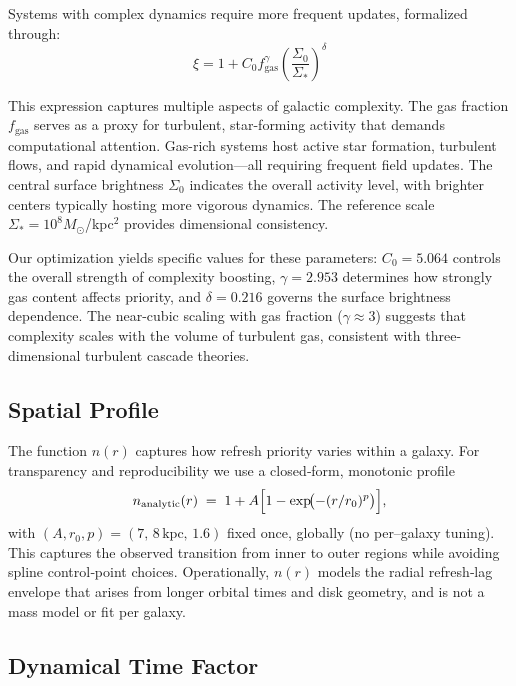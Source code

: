 \documentclass[twocolumn,prd,amsmath,amssymb,aps,superscriptaddress,nofootinbib]{revtex4-2}
\begin{document}
Systems with complex dynamics require more frequent updates, formalized through:
\begin{equation}
\xi = 1 + C_0 f_{\text{gas}}^\gamma \left(\frac{\Sigma_0}{\Sigma_*}\right)^\delta
\end{equation}

This expression captures multiple aspects of galactic complexity. The gas fraction $f_{\text{gas}}$ serves as a proxy for turbulent, star-forming activity that demands computational attention. Gas-rich systems host active star formation, turbulent flows, and rapid dynamical evolution---all requiring frequent field updates. The central surface brightness $\Sigma_0$ indicates the overall activity level, with brighter centers typically hosting more vigorous dynamics. The reference scale $\Sigma_* = 10^8 M_\odot$/kpc$^2$ provides dimensional consistency.

Our optimization yields specific values for these parameters: $C_0 = 5.064$ controls the overall strength of complexity boosting, $\gamma = 2.953$ determines how strongly gas content affects priority, and $\delta = 0.216$ governs the surface brightness dependence. The near-cubic scaling with gas fraction ($\gamma \approx 3$) suggests that complexity scales with the volume of turbulent gas, consistent with three-dimensional turbulent cascade theories.

\subsection{Spatial Profile}

The function $n(r)$ captures how refresh priority varies within a galaxy. For transparency and reproducibility we use a closed‑form, monotonic profile
\begin{equation}
  n_{\mathrm{analytic}}(r)\;=\;1 + A\Bigl[1 - \exp\!\bigl(-(r/r_0)^p\bigr)\Bigr],
\end{equation}
with $(A, r_0, p) = (7,\,8\,\mathrm{kpc},\,1.6)$ fixed once, globally (no per–galaxy tuning). This captures the observed transition from inner to outer regions while avoiding spline control‑point choices.
Operationally, $n(r)$ models the radial refresh‑lag envelope that arises from longer orbital times and disk geometry, and is not a mass model or fit per galaxy.

\subsection{Dynamical Time Factor}
\end{document}

